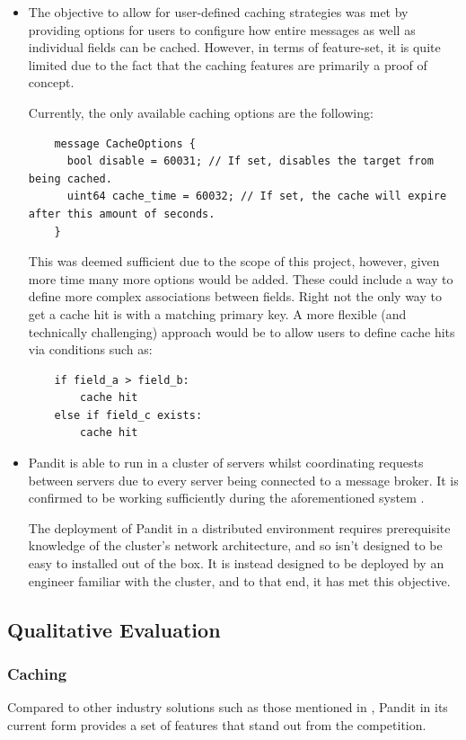 \documentclass[a4paper,12pt]{report}
\begin{document}
\begin{itemize}
    \item The objective to allow for user-defined caching strategies was met by providing options for users to configure how entire messages as well as individual fields can be cached.
    However, in terms of feature-set, it is quite limited due to the fact that the caching features are primarily a proof of concept.
    
    Currently, the only available caching options are the following:
    \begin{lstlisting}
    message CacheOptions {
      bool disable = 60031; // If set, disables the target from being cached.
      uint64 cache_time = 60032; // If set, the cache will expire after this amount of seconds.
    }
    \end{lstlisting}
    This was deemed sufficient due to the scope of this project, however, given more time many more options would be added.
    These could include a way to define more complex associations between fields. 
    Right not the only way to get a cache hit is with a matching primary key. 
    A more flexible (and technically challenging) approach would be to allow users to define cache hits via conditions such as:
    \begin{lstlisting}
    if field_a > field_b:
        cache hit
    else if field_c exists:
        cache hit
    \end{lstlisting}
    
    \item Pandit is able to run in a cluster of servers whilst coordinating requests between servers due to every server being connected to a message broker.
    It is confirmed to be working sufficiently during the aforementioned system . 
    
    The deployment of Pandit in a distributed environment requires prerequisite knowledge of the cluster's network architecture, and so isn't designed to be easy to installed out of the box. 
    It is instead designed to be deployed by an engineer familiar with the cluster, and to that end, it has met this objective.
    
\end{itemize}

\subsection{Qualitative Evaluation}
\label{sec:qual}
\subsubsection{Caching}
Compared to other industry solutions such as those mentioned in , Pandit in its current form provides a set of features that stand out from the competition.
\end{document}
